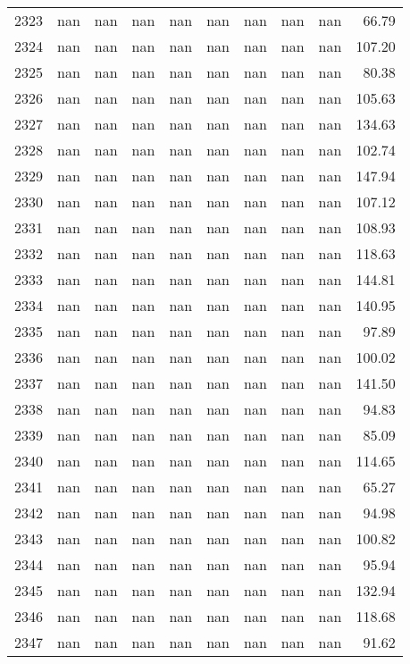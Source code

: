 \begin{tabular}{lrrrrrrrrr}
2323 & nan & nan & nan & nan & nan & nan & nan & nan & 66.79 \\
2324 & nan & nan & nan & nan & nan & nan & nan & nan & 107.20 \\
2325 & nan & nan & nan & nan & nan & nan & nan & nan & 80.38 \\
2326 & nan & nan & nan & nan & nan & nan & nan & nan & 105.63 \\
2327 & nan & nan & nan & nan & nan & nan & nan & nan & 134.63 \\
2328 & nan & nan & nan & nan & nan & nan & nan & nan & 102.74 \\
2329 & nan & nan & nan & nan & nan & nan & nan & nan & 147.94 \\
2330 & nan & nan & nan & nan & nan & nan & nan & nan & 107.12 \\
2331 & nan & nan & nan & nan & nan & nan & nan & nan & 108.93 \\
2332 & nan & nan & nan & nan & nan & nan & nan & nan & 118.63 \\
2333 & nan & nan & nan & nan & nan & nan & nan & nan & 144.81 \\
2334 & nan & nan & nan & nan & nan & nan & nan & nan & 140.95 \\
2335 & nan & nan & nan & nan & nan & nan & nan & nan & 97.89 \\
2336 & nan & nan & nan & nan & nan & nan & nan & nan & 100.02 \\
2337 & nan & nan & nan & nan & nan & nan & nan & nan & 141.50 \\
2338 & nan & nan & nan & nan & nan & nan & nan & nan & 94.83 \\
2339 & nan & nan & nan & nan & nan & nan & nan & nan & 85.09 \\
2340 & nan & nan & nan & nan & nan & nan & nan & nan & 114.65 \\
2341 & nan & nan & nan & nan & nan & nan & nan & nan & 65.27 \\
2342 & nan & nan & nan & nan & nan & nan & nan & nan & 94.98 \\
2343 & nan & nan & nan & nan & nan & nan & nan & nan & 100.82 \\
2344 & nan & nan & nan & nan & nan & nan & nan & nan & 95.94 \\
2345 & nan & nan & nan & nan & nan & nan & nan & nan & 132.94 \\
2346 & nan & nan & nan & nan & nan & nan & nan & nan & 118.68 \\
2347 & nan & nan & nan & nan & nan & nan & nan & nan & 91.62 \\

\end{tabular}
